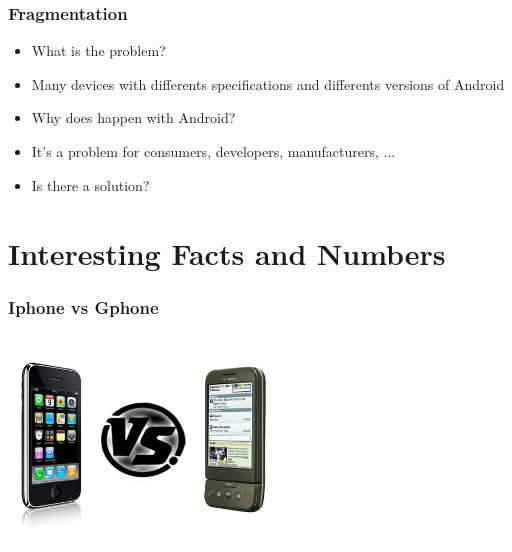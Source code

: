 \documentclass{beamer}
\begin{document}
\begin{frame}
\frametitle{Fragmentation}

\begin{itemize}
\item What is the problem?
\item Many devices with differents specifications and differents
  versions of Android
\item Why does happen with Android?
\item It's a problem for consumers, developers, manufacturers, ...
\item Is there a solution?
\end{itemize}

\end{frame}

\section{Interesting Facts and Numbers}

\begin{frame}
\frametitle{Iphone vs Gphone}
\begin{center}
   \includegraphics[height=5.5cm]{figs/iphone-vs-gphone.jpg}
\end{center}
\end{frame}
\end{document}
